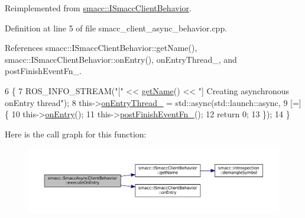 Reimplemented from \hyperlink{classsmacc_1_1ISmaccClientBehavior_a90b7032f7520f9e7e805835e6ed9d43e}{smacc\+::\+I\+Smacc\+Client\+Behavior}.



Definition at line 5 of file smacc\+\_\+client\+\_\+async\+\_\+behavior.\+cpp.



References smacc\+::\+I\+Smacc\+Client\+Behavior\+::get\+Name(), smacc\+::\+I\+Smacc\+Client\+Behavior\+::on\+Entry(), on\+Entry\+Thread\+\_\+, and post\+Finish\+Event\+Fn\+\_\+.


\begin{DoxyCode}
6     \{
7         ROS\_INFO\_STREAM(\textcolor{stringliteral}{"["} << \hyperlink{classsmacc_1_1ISmaccClientBehavior_a18e4bec9460b010f2894c0f7e7064a34}{getName}() << \textcolor{stringliteral}{"] Creating asynchronous onEntry thread"});
8         this->\hyperlink{classsmacc_1_1SmaccAsyncClientBehavior_a6346e036a68f41c4397d7336f8519645}{onEntryThread\_} = std::async(std::launch::async,
9                                           [=] \{
10                                               this->\hyperlink{classsmacc_1_1ISmaccClientBehavior_a9877684b1954429719826e2d0924d980}{onEntry}();
11                                               this->\hyperlink{classsmacc_1_1SmaccAsyncClientBehavior_af7a9ee952ba3fb8629aa55491606a7b2}{postFinishEventFn\_}();
12                                               \textcolor{keywordflow}{return} 0;
13                                           \});
14     \}
\end{DoxyCode}
Here is the call graph for this function\+:
\nopagebreak
\begin{figure}[H]
\begin{center}
\leavevmode
\includegraphics[width=350pt]{classsmacc_1_1SmaccAsyncClientBehavior_ab8ca63d40d61554263466fe4c0b5cbd1_cgraph}
\end{center}
\end{figure}
\mbox{\label{classsmacc_1_1SmaccAsyncClientBehavior_a3d982d370df4f133ad37c0b2370e9b82}} 
